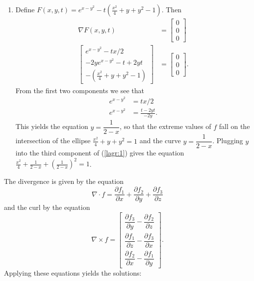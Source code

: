 \begin{enumerate}
 \item
  Define $F(x,y,t) = e^{x-y^2} - t(\frac{x^2}{4}+y+y^2 - 1)$.  Then
  \begin{align}
   \nabla F(x,y,t) &= \begin{bmatrix} 0 \\ 0 \\ 0 \end{bmatrix} \nonumber \\
   \begin{bmatrix}
    e^{x-y^2} - tx/2 \\
    -2ye^{x-y^2} - t + 2yt \\
    -(\frac{x^2}{4}+y+y^2 - 1)
   \end{bmatrix} &= \begin{bmatrix} 0 \\ 0 \\ 0 \end{bmatrix}. \label{lagr:1}
  \end{align}
  From the first two components we see that
  \begin{align*}
   e^{x-y^2} &= tx/2 \\
   e^{x - y^2} &= \frac{t-2yt}{-2y}.
  \end{align*}
  This yields the equation $y = \dfrac{1}{2-x}$, so that the extreme values
  of $f$ fall on the intersection of the ellipse $\frac{x^2}{4}+y+y^2 = 1$
  and the curve $y = \dfrac{1}{2-x}$.
  Plugging $y$ into the third component of (\ref{lagr:1}) gives the equation
  $\frac{x^2}{4} + \frac{1}{2-x} + (\frac{1}{2-x})^2 = 1$.

\end{enumerate}

\item

The divergence is given by the equation \[
 \nabla \cdot f = \frac{\partial f_1}{\partial x} + \frac{\partial f_2}{\partial y} + \frac{\partial f_3}{\partial z}
\] and the curl by the equation \[
 \nabla \times f = \begin{bmatrix}
  \dfrac{\partial f_3}{\partial y} - \dfrac{\partial f_2}{\partial z} \\
  \dfrac{\partial f_1}{\partial z} - \dfrac{\partial f_3}{\partial x} \\
  \dfrac{\partial f_2}{\partial x} - \dfrac{\partial f_1}{\partial y}
 \end{bmatrix}.
\]  Applying these equations yields the solutions:


